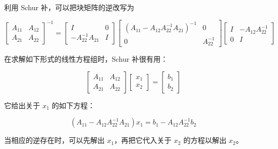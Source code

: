 利用 Schur 补，可以把块矩阵的逆改写为

\[
   \left[ \begin{array}{c|c} A_{11} & A_{12} \\ \hline A_{21} & A_{22} \end{array} \right]^{-1}
= \left[ \begin{array}{c|c} I & 0 \\ \hline -A_{22}^{-1}A_{21} & I \end{array} \right] \left[ \begin{array}{c|c} (A_{11} - A_{12}A_{22}^{-1}A_{21})^{-1} & 0 \\ \hline 0 & A_{22}^{-1} \end{array} \right] \left[ \begin{array}{c|c} I & -A_{12}A_{22}^{-1} \\ \hline 0 & I \end{array} \right]
\]

在求解如下形式的线性方程组时，Schur 补很有用：

\[
   \left[ \begin{array}{c|c} A_{11} & A_{12} \\ \hline A_{21} & A_{22} \end{array} \right] \left[ \begin{array}{c} x_1 \\ x_2 \end{array} \right] = \left[ \begin{array}{c} b_1 \\ b_2 \end{array} \right]
\]

它给出关于 $x_1$ 的如下方程：

\[
   (A_{11} - A_{12}A_{22}^{-1}A_{21})x_1 = b_1 - A_{12}A_{22}^{-1}b_2
\]

当相应的逆存在时，可以先解出 $x_1$，再把它代入关于 $x_2$ 的方程以解出 $x_2$。

